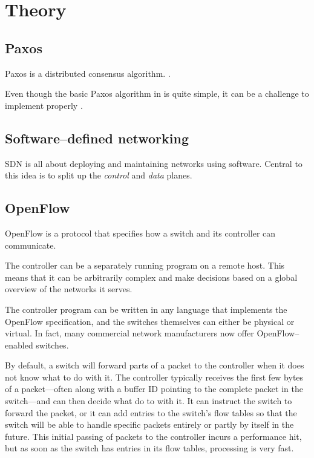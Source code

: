 \chapter{Theory}

\section{Paxos}
Paxos is a distributed consensus algorithm.
.

Even though the basic Paxos algorithm in \cite{Lam01} is quite simple, it can be
a challenge to implement properly \cite{Chandra:2007:PML:1281100.1281103}.

\section{Software--defined networking}

\ac{SDN} is all about deploying and maintaining networks using software.
Central to this idea is to split up the \textit{control} and \textit{data}
planes.

\section{OpenFlow}

OpenFlow is a protocol that specifies how a switch and its controller can
communicate.

The controller can be a separately running program on a remote host. This
means that it can be arbitrarily complex and make decisions based on a
global overview of the networks it serves.

The controller program can be written in any language that implements the
OpenFlow specification, and the switches themselves can either be physical
or virtual.  In fact, many commercial network manufacturers now offer
OpenFlow--enabled switches.

By default, a switch will forward parts of a packet to the controller when
it does not know what to do with it.  The controller typically receives the
first few bytes of a packet---often along with a buffer ID pointing to the
complete packet in the switch---and can then decide what do to with it.  It
can instruct the switch to forward the packet, or it can add entries to the
switch's flow tables so that the switch will be able to handle specific
packets entirely or partly by itself in the future.  This initial passing of
packets to the controller incurs a performance hit, but as soon as the
switch has entries in its flow tables, processing is very fast.

